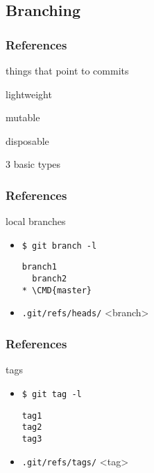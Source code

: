 \documentclass[english]{beamer}
\newcommand{\mysubsection}[2]{%
  \hypertarget{#2}{}%
  \subsection{#1}%
  \label{#2}%
}
\newcommand{\CMD}[1]{%
\texttt{\textcolor{code-green}{#1}}%
}
\newcommand{\cmd}[1]{%
\texttt{\textcolor{code-orange}{#1}}%
}
\begin{document}
\mysubsection{Branching}{using:branching}
\begin{frame}
\frametitle{References}
things that point to commits

\pause{}
\vspace{\baselineskip}
lightweight

\pause{}
\vspace{\baselineskip}
mutable

\pause{}
\vspace{\baselineskip}
disposable

\pause{}
\vspace{\baselineskip}
3 basic types

\end{frame}

\begin{frame}[fragile]
\frametitle{References}
local branches
\begin{itemize}
        \item \CMD{\$ git branch -l} \\
                {\small
                \begin{Verbatim}[commandchars=\\\{\}]
  branch1
  branch2
* \CMD{master}
                \end{Verbatim}
                }
        \item \cmd{.git/refs/heads/}<branch>
\end{itemize}
\end{frame}

\begin{frame}[fragile]
\frametitle{References}
tags
\begin{itemize}
        \item \CMD{\$ git tag -l} \\
                {\small
                \begin{Verbatim}[commandchars=\\\{\}]
tag1
tag2
tag3
                \end{Verbatim}
                }
        \item \cmd{.git/refs/tags/}<tag>
\end{itemize}
\end{frame}
\end{document}
